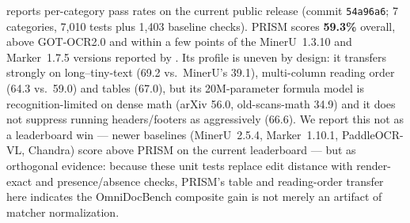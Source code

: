  reports per-category pass rates on the current public release (commit \texttt{54a96a6}; 7 categories, 7{,}010 tests plus 1{,}403 baseline checks). PRISM scores \textbf{59.3\%} overall, above GOT-OCR2.0 and within a few points of the MinerU~1.3.10 and Marker~1.7.5 versions reported by \citet{olmocr}. Its profile is uneven by design: it transfers strongly on long--tiny-text (69.2 vs.\ MinerU's 39.1), multi-column reading order (64.3 vs.\ 59.0) and tables (67.0), but its 20M-parameter formula model is recognition-limited on dense math (arXiv 56.0, old-scans-math 34.9) and it does not suppress running headers/footers as aggressively (66.6). We report this not as a leaderboard win --- newer baselines (MinerU~2.5.4, Marker~1.10.1, PaddleOCR-VL, Chandra) score above PRISM on the current leaderboard --- but as orthogonal evidence: because these unit tests replace edit distance with render-exact and presence/absence checks, PRISM's table and reading-order transfer here indicates the OmniDocBench composite gain is not merely an artifact of matcher normalization.

